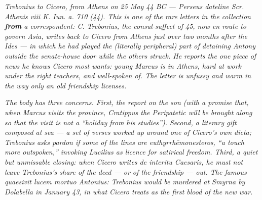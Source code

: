 
\textit{Trebonius to Cicero, from Athens on 25 May 44 BC ---
Perseus dateline \textit{Scr. Athenis viii K. Iun. a. 710 (44)}.
This is one of the rare letters in the collection \textbf{from} a
correspondent: C. Trebonius, the consul-suffect of 45, now en route
to govern Asia, writes back to Cicero from Athens just over two
months after the Ides --- in which he had played the (literally
peripheral) part of detaining Antony outside the senate-house door
while the others struck. He reports the one piece of news he knows
Cicero most wants: young Marcus is in Athens, hard at work under the
right teachers, and well-spoken of. The letter is unfussy and warm
in the way only an old friendship licenses.}

\textit{The body has three concerns. First, the report on the son
(with a promise that, when Marcus visits the province, Cratippus
the Peripatetic will be brought along so that the visit is not a
``holiday from his studies''). Second, a literary gift composed at
sea --- a set of verses worked up around one of Cicero's own
\textit{dicta}; Trebonius asks pardon if some of the lines are
\textit{euthyrrh\=emonesteros}, ``a touch more outspoken,'' invoking
Lucilius as licence for satirical freedom. Third, a quiet but
unmissable closing: when Cicero writes \textit{de interitu Caesaris},
he must not leave Trebonius's share of the deed --- or of the
friendship --- out. The famous \textit{quaesivit lucem mortuo
Antonius}: Trebonius would be murdered at Smyrna by Dolabella in
January 43, in what Cicero treats as the first blood of the new war.}
